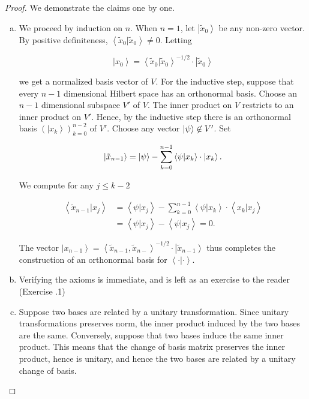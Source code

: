 \documentclass{article}
\theoremstyle{definition}
\numberwithin{figure}{section}
\begin{document}
\begin{proof} We demonstrate the claims one by one.

\begin{enumerate}[(a)]
\item We proceed by induction on $n$. When $n=1$, let $\left|\tilde{x}_0\right>$ be any non-zero vector. By positive definiteness, $\left<\tilde{x}_0|\tilde{x}_0\right>\neq 0$. Letting

$$\left|x_0\right>=\left<\tilde{x}_0|\tilde{x}_0\right>^{-1/2}\cdot \left|\tilde{x}_0\right>$$

we get a normalized basis vector of $V$. For the inductive step, suppose that every $n-1$ dimensional Hilbert space has an orthonormal basis. Choose an $n-1$ dimensional subspace $V'$ of $V$. The inner product on $V$ restricts to an inner product on $V'$. Hence, by the inductive step there is an orthonormal basis $\left(\left|x_k\right>\right)_{k=0}^{n-2}$ of $V'$. Choose any vector $\left|\psi\right>\not\in V'$. Set

$$\left|\tilde{x}_{n-1}\right>=\left|\psi\right>-\sum_{k=0}^{n-1}\left<\psi|x_k\right>\cdot \left|x_k\right>.$$

We compute for any $j\leq k-2$

\begin{align*}
\left<\tilde{x}_{n-1}| x_j\right>&=\left<\psi | x_j\right>-\sum_{k=0}^{n-1}\left<\psi | x_k\right>\cdot \left< x_{k} | x_j\right>\\
&=\left<\psi | x_j\right>-\left<\psi | x_j\right>=0.
\end{align*}

The vector $\left|x_{n-1}\right>=\left<\tilde{x}_{n-1},\tilde{x}_{n-}\right>^{-1/2}\cdot \left|\tilde{x}_{n-1}\right>$ thus completes the construction of an orthonormal basis for $\left<\cdot | \cdot\right>$.

\item Verifying the axioms is immediate, and is left as an exercise to the reader (Exercise \thesection.1)

\item Suppose two bases are related by a unitary transformation. Since unitary transformations preserves norm, the inner product induced by the two bases are the same. Conversely, suppose that two bases induce the same inner product. This means that the change of basis matrix preserves the inner product, hence is unitary, and hence the two bases are related by a unitary change of basis. 
\end{enumerate}

\end{proof}
\end{document}
